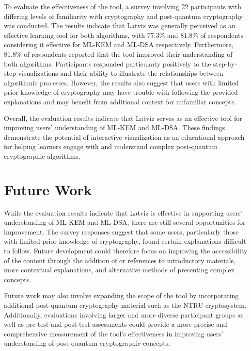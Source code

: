 \documentclass[runningheads]{llncs}
\begin{document}
To evaluate the effectiveness of the tool, a survey involving 22 participants with differing levels of familiarity with cryptography and post-quantum cryptography was conducted. The results indicate that Latviz was generally perceived as an effective learning tool for both algorithms, with 77.3\% and 81.8\% of respondents considering it effective for ML-KEM and ML-DSA respectively. Furthermore, 81.8\% of respondents reported that the tool improved their understanding of both algorithms. Participants responded particularly positively to the step-by-step visualizations and their ability to illustrate the relationships between algorithmic processes. However, the results also suggest that users with limited prior knowledge of cryptography may have trouble with following the provided explanations and may benefit from additional context for unfamiliar concepts.

Overall, the evaluation results indicate that Latviz serves as an effective tool for improving users' understanding of ML-KEM and ML-DSA. These findings demonstrate the potential of interactive visualization as an educational approach for helping learners engage with and understand complex post-quantum cryptographic algorithms.

\section{Future Work}
While the evaluation results indicate that Latviz is effective in supporting users' understanding of ML-KEM and ML-DSA, there are still several opportunities for improvement. The survey responses suggest that some users, particularly those with limited prior knowledge of cryptography, found certain explanations difficult to follow. Future development could therefore focus on improving the accessibility of the content through the addition of or references to introductory materials, more contextual explanations, and alternative methods of presenting complex concepts.

Future work may also involve expanding the scope of the tool by incorporating additional post-quantum cryptography material such as the NTRU cryptosystem. Additionally, evaluations involving larger and more diverse participant groups as well as pre-test and post-test assessments could provide a more precise and comprehensive measurement of the tool's effectiveness in improving users' understanding of post-quantum cryptographic concepts.

%
%
%


%
\end{document}
